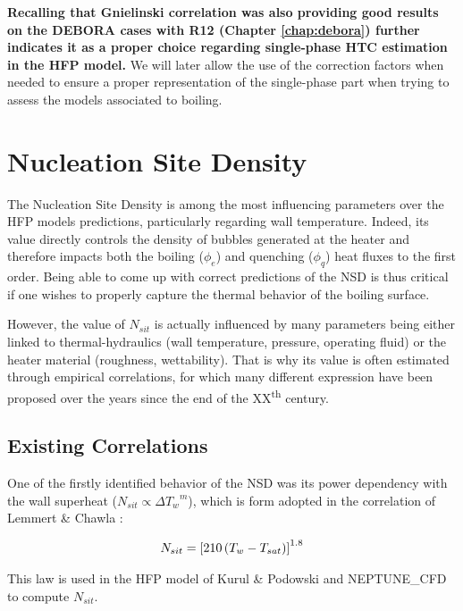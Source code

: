\npar
\textbf{Recalling that Gnielinski correlation was also providing good results on the DEBORA cases with R12 (Chapter \ref{chap:debora}) further indicates it as a proper choice regarding single-phase HTC estimation in the HFP model.} We will later allow the use of the correction factors when needed to ensure a proper representation of the single-phase part when trying to assess the models associated to boiling.







\section{Nucleation Site Density}
\label{sec:NSD}

The Nucleation Site Density is among the most influencing parameters over the HFP models predictions, particularly regarding wall temperature. Indeed, its value directly controls the density of bubbles generated at the heater and therefore impacts both the boiling ($\phi_{e}$) and quenching ($\phi_{q}$) heat fluxes to the first order. Being able to come up with correct predictions of the NSD is thus critical if one wishes to properly capture the thermal behavior of the boiling surface.

\npar

However, the value of $N_{sit}$ is actually influenced by many parameters being either linked to thermal-hydraulics (wall temperature, pressure, operating fluid) or the heater material (roughness, wettability). That is why its value is often estimated through empirical correlations, for which many different expression have been proposed over the years since the end of the XX\textsuperscript{th} century.

\subsection{Existing Correlations}

One of the firstly identified behavior of the NSD was its power dependency with the wall superheat ($N_{sit} \propto {\Delta T_{w}}^{m}$), which is form adopted in the correlation of Lemmert \& Chawla \cite{lemmert_influence_1977} : 

\begin{align}
N_{sit}=\left[ 210\left( T_{w}-T_{sat} \right) \right]^{1.8}
\label{eq:nsit_lemmert}
\end{align}

\begin{remark*}{}
This law is used in the HFP model of Kurul \& Podowski and NEPTUNE\_CFD to compute $N_{sit}$.
\end{remark*}

